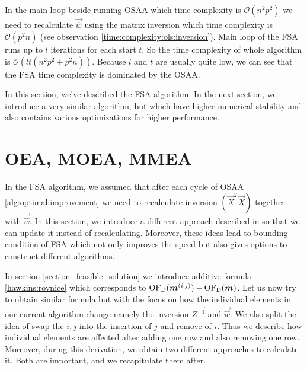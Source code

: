\begin{observation}  \label{time:complexity:fsa}
In the main loop beside running OSAA which time complexity is $\mathcal{O}(n^2p^2)$ we need to recalculate $\vec{\hat{w}}$ using the matrix inversion which time complexity is $\mathcal{O}(p^2n)$ (see observation \ref{time:complexity:ols:inversion}).
Main loop of the FSA runs up to $l$ iterations for each start $t$. So the time complexity of whole algorithm is  $\mathcal{O}( lt(n^2p^2 + p^2n)  )$. Because $l$ and $t$ are usually quite low, we can see that the FSA time complexity is dominated by the OSAA. 
\end{observation} 

In this section, we've described the FSA algorithm. In the next section, we introduce a very similar algorithm, but which have higher numerical stability and also contains various optimizations for higher performance.








\section{OEA, MOEA, MMEA} 

In the FSA algorithm, we assumed that after each cycle of OSAA 
\ref{alg:optimal:improvement} we need to recalculate inversion $(\vec{X}^T\vec{X})$ together with $\vec{\hat{w}}$. In this section, we introduce a different approach described in \cite{agullo2001new} so that we can update it instead of recalculating. Moreover, these ideas lead to bounding condition of FSA which not only improves the speed but also gives options to construct different algorithms. 

In section \ref{section_feasible_solution} we introduce additive formula \ref{hawkins:rovnice} which corresponds to $\operatorname{OF_D}(\boldsymbol{m}^{(i,j)}) - \operatorname{OF_D}(\boldsymbol{m})$. Let us now try to obtain similar formula but with the focus on how the individual elements in our current algorithm change namely the inversion $\vec{Z^{-1}}$ and $\vec{\hat{w}}$. We also split the idea of swap the $i, j$ into the insertion of $j$ and remove of $i$. Thus we describe how individual elements are affected after adding one row and also removing one row. Moreover, during this derivation, we obtain two different approaches to calculate it. Both are important, and we recapitulate them after.




